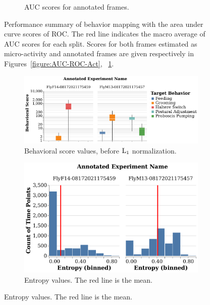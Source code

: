 \begin{figure}[htb!]
\begin{subfigure}[b]{0.5\linewidth}
		\caption{AUC scores for annotated frames. \label{figure:AUC-ROC-Ann}}
	\end{subfigure}%
	\caption[Performance summary of behavior mapping with the area under curve scores of ROC.]
	{Performance summary of behavior mapping with the area under curve scores of ROC.
		The red line indicates the macro average of AUC scores for each split.
		Scores for both frames estimated as micro-activity and annotated frames are given respectively in Figures~\ref{figure:AUC-ROC-Act}, ~\ref{figure:AUC-ROC-Ann}.
		\label{figure:AUC}}
\end{figure}

\begin{figure}[htb!]
	\centering
	\begin{subfigure}[b]{0.545\linewidth}
		\centering\includegraphics[width=\linewidth]{figures/BehavioralScores-RepertoireDifference.pdf}
		\caption{Behavioral score values, before $\textnormal{L}_1$ normalization. \label{figure:repertoire-score-comparison}}
	\end{subfigure}%
	\hfill
	\begin{subfigure}[b]{0.445\linewidth}
		\centering\includegraphics[width=\linewidth]{figures/Entropy-RepertoireDifference.pdf}
		\caption{Entropy values. The red line is the mean. \label{figure:repertoire-entropy-comparison}}

\end{subfigure}
\end{figure}
